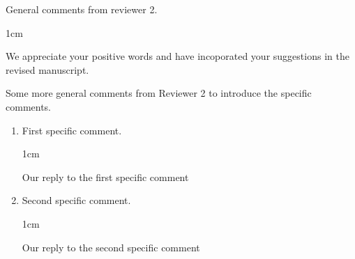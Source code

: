 \documentclass[rightcolwidth=.38]{ugent-note}
\newenvironment{reply}{%
    \begin{adjustwidth}{1cm}{}
    \color{ugentblue}%
}{%
    \end{adjustwidth}
}
\begin{document}
General comments from reviewer 2.

\begin{reply}
    We appreciate your positive words and have incoporated your suggestions in the revised manuscript.
\end{reply}

Some more general comments from Reviewer 2 to introduce the specific comments.

\begin{enumerate}[parsep=0.5em]
    \item First specific comment.
    \begin{reply}
        Our reply to the first specific comment
    \end{reply}

    \item Second specific comment.
    \begin{reply}
        Our reply to the second specific comment
    \end{reply}
\end{enumerate}
\end{document}
